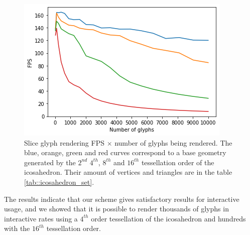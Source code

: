 \documentclass[twoside,twocolumn,10pt]{article}
\begin{document}
\begin{figure}[ht]
    \centering
    \includegraphics[width=.95\linewidth, angle=0]{figs/Benchmark/benchmark_half_texopt.png}
    \caption{Slice glyph rendering FPS $\times$ number of glyphs being rendered. The blue, orange, green and red curves correspond to a base geometry generated by the $2^{nd}$ $4^{th}$, $8^{th}$ and $16^{th}$ tessellation order of the icosahedron. Their amount of vertices and triangles are in the table \ref{tab::icosahedron_set}.}
    \label{fig::slice_benchmark}
\end{figure}

The results indicate that our scheme gives satisfactory results for interactive usage, and we showed that it is possible to render thousands of glyphs in interactive rates using a $4^{th}$ order tessellation of the icosahedron and hundreds with the $16^{th}$ tessellation order.








\end{document}
